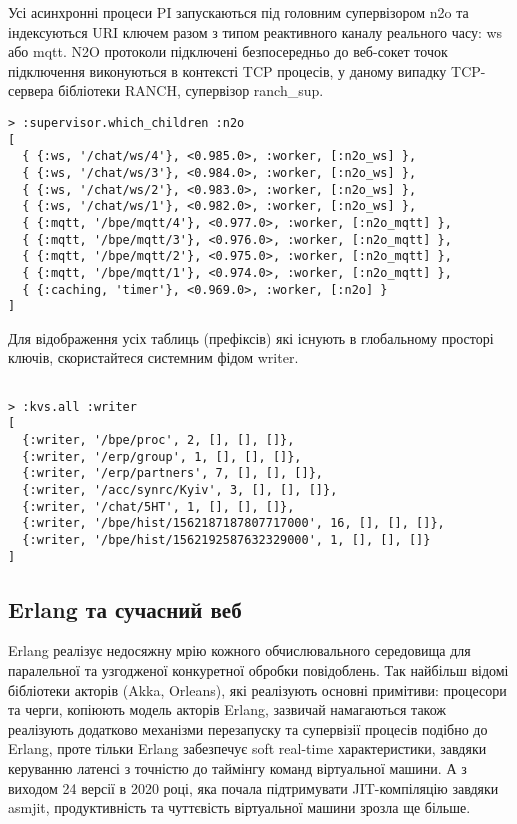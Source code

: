 Усі асинхронні процеси PI запускаються під головним супервізором n2o та індексуються
URI ключем разом з типом реактивного каналу реального часу: ws або mqtt. N2O протоколи
підключені безпосередньо до веб-сокет точок підключення виконуються в контексті TCP
процесів, у даному випадку TCP-сервера бібліотеки RANCH, супервізор ranch_sup.

\begin{lstlisting}
> :supervisor.which_children :n2o
[
  { {:ws, '/chat/ws/4'}, <0.985.0>, :worker, [:n2o_ws] },
  { {:ws, '/chat/ws/3'}, <0.984.0>, :worker, [:n2o_ws] },
  { {:ws, '/chat/ws/2'}, <0.983.0>, :worker, [:n2o_ws] },
  { {:ws, '/chat/ws/1'}, <0.982.0>, :worker, [:n2o_ws] },
  { {:mqtt, '/bpe/mqtt/4'}, <0.977.0>, :worker, [:n2o_mqtt] },
  { {:mqtt, '/bpe/mqtt/3'}, <0.976.0>, :worker, [:n2o_mqtt] },
  { {:mqtt, '/bpe/mqtt/2'}, <0.975.0>, :worker, [:n2o_mqtt] },
  { {:mqtt, '/bpe/mqtt/1'}, <0.974.0>, :worker, [:n2o_mqtt] },
  { {:caching, 'timer'}, <0.969.0>, :worker, [:n2o] }
]
\end{lstlisting}

Для відображення усіх таблиць (префіксів) які існують в глобальному
просторі ключів, скористайтеся системним фідом writer.

\begin{lstlisting}

> :kvs.all :writer
[
  {:writer, '/bpe/proc', 2, [], [], []},
  {:writer, '/erp/group', 1, [], [], []},
  {:writer, '/erp/partners', 7, [], [], []},
  {:writer, '/acc/synrc/Kyiv', 3, [], [], []},
  {:writer, '/chat/5HT', 1, [], [], []},
  {:writer, '/bpe/hist/1562187187807717000', 16, [], [], []},
  {:writer, '/bpe/hist/1562192587632329000', 1, [], [], []}
]
\end{lstlisting}

\subsection{Erlang та сучасний веб}

Erlang реалізує недосяжну мрію кожного обчислювального середовища для
паралельної та узгодженої конкуретної обробки повідоблень. Так найбільш
відомі бібліотеки акторів (Akka, Orleans), які реалізують основні примітиви:
процесори та черги, копіюють модель акторів Erlang, зазвичай намагаються
також реалізують додатково механізми перезапуску та супервізії процесів
подібно до Erlang, проте тільки Erlang забезпечує soft real-time характеристики,
завдяки керуванню латенсі з точністю до таймінгу команд віртуальної машини.
А з виходом 24 версії в 2020 році, яка почала підтримувати JIT-компіляцію
завдяки asmjit, продуктивність та чуттєвість віртуальної машини зрозла
ще більше.

